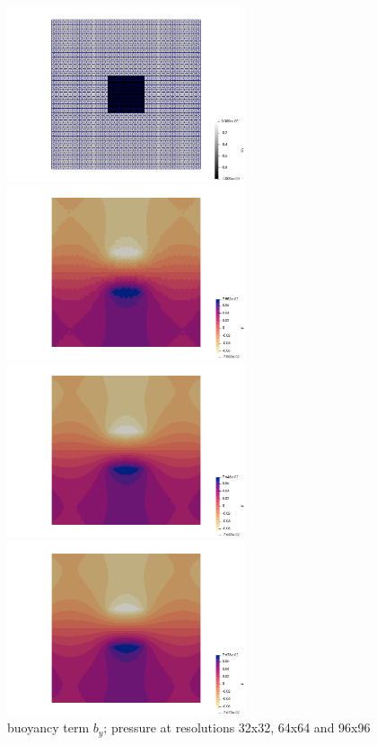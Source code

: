 \begin{center}
\includegraphics[width=7cm]{python_codes/fieldstone_78/results/block/by}
\includegraphics[width=7cm]{python_codes/fieldstone_78/results/block/p32}\\
\includegraphics[width=7cm]{python_codes/fieldstone_78/results/block/p64}
\includegraphics[width=7cm]{python_codes/fieldstone_78/results/block/p96}\\
{\captionfont buoyancy term $b_y$; pressure at resolutions 32x32, 64x64 and 96x96}
\end{center}


